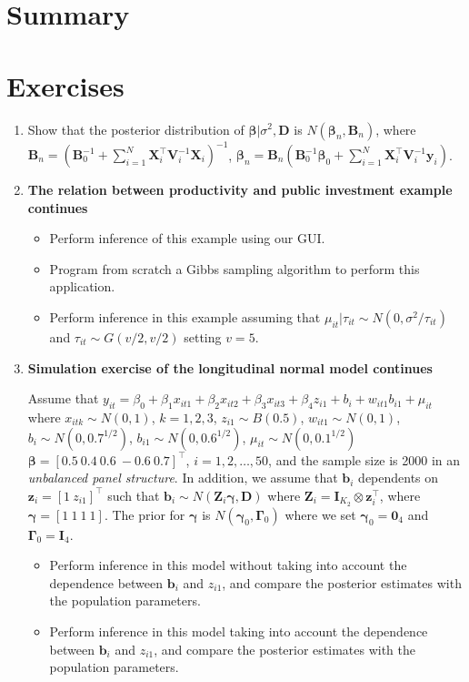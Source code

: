 \section{Summary}\label{sec94}

\section{Exercises}\label{sec95}

\begin{enumerate}
	
	\item Show that the posterior distribution of $\bm{\beta}|\sigma^2,\bm{D}$ is $N(\bm{\beta}_n,\bm{B}_n)$, where $\bm{B}_n = (\bm{B}_0^{-1} +\sum_{i=1}^N \bm{X}_i^{\top}\bm{V}_i^{-1}\bm{X}_i)^{-1}$, $\bm{\beta}_n= \bm{B}_n(\bm{B}_0^{-1}\bm{\beta}_0 + \sum_{i=1}^N\bm{X}_i^{\top}\bm{V}_i^{-1}\bm{y}_i)$.
	
	\item \textbf{The relation between productivity and public investment example continues}
	
	\begin{itemize}
		\item Perform inference of this example using our GUI.
		\item Program from scratch a Gibbs sampling algorithm to perform this application.
		\item Perform inference in this example assuming that $\mu_{it}|\tau_{it}\sim N(0, \sigma^2/\tau_{it})$ and $\tau_{it}\sim G(v/2,v/2)$ setting $v=5$. 
	\end{itemize}
  
	\item \textbf{Simulation exercise of the longitudinal normal model continues}
	
	
	Assume that $y_{it}=\beta_0+\beta_1x_{it1}+\beta_2x_{it2}+\beta_3x_{it3}+\beta_4 z_{i1}+b_i+w_{it1}b_{i1}+\mu_{it}$ where $x_{itk}\sim N(0,1)$, $k=1,2,3$, $z_{i1}\sim B(0.5)$, $w_{it1}\sim N(0,1)$, $b_i\sim N(0, 0.7^{1/2})$, $b_{i1}\sim N(0, 0.6^{1/2})$, $\mu_{it}\sim N(0, 0.1^{1/2})$ $\bm{\beta}=[0.5 \ 0.4 \ 0.6 \ -0.6 \ 0.7]^{\top}$, $i=1,2,\dots,50$, and the sample size is 2000 in an \textit{unbalanced panel structure}. In addition, we assume that $\bm{b}_i$ dependents on $\bm{z}_i=[1 \ z_{i1}]^{\top}$ such that $\bm{b}_i\sim N(\bm{Z}_i\bm{\gamma},\bm{D})$ where $\bm{Z}_i=\bm{I}_{K_2}\otimes \bm{z}_i^{\top}$, where $\bm{\gamma}=[1 \ 1 \ 1 \ 1]$. The prior for $\bm{\gamma}$ is $N(\bm{\gamma}_0,\bm{\Gamma}_0)$ where we set $\bm{\gamma}_0=\bm{0}_4$ and $\bm{\Gamma}_0=\bm{I}_4$. 
	
	\begin{itemize}
		\item Perform inference in this model without taking into account the dependence between $\bm{b}_i$ and $z_{i1}$, and compare the posterior estimates with the population parameters.
		\item Perform inference in this model taking into account the dependence between $\bm{b}_i$ and $z_{i1}$, and compare the posterior estimates with the population parameters. 
	\end{itemize}
	
	
	
\end{enumerate}
